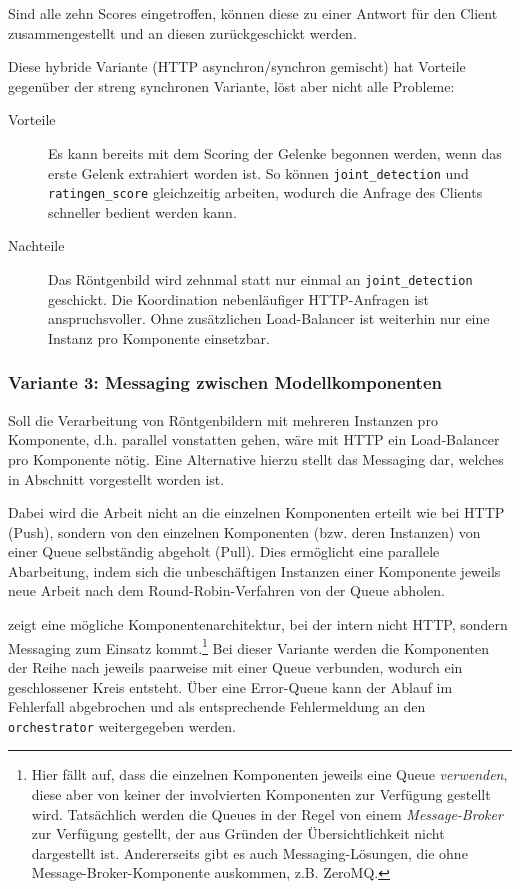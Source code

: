 Sind alle zehn Scores eingetroffen, können diese zu einer Antwort für den Client zusammengestellt und an diesen zurückgeschickt werden.

Diese hybride Variante (HTTP asynchron/synchron gemischt) hat Vorteile gegenüber der streng synchronen Variante, löst aber nicht alle Probleme:

\begin{description}
    \item[Vorteile] Es kann bereits mit dem Scoring der Gelenke begonnen werden, wenn das erste Gelenk extrahiert worden ist. So können \texttt{joint\_detection} und \texttt{ratingen\_score} gleichzeitig arbeiten, wodurch die Anfrage des Clients schneller bedient werden kann.
    \item[Nachteile] Das Röntgenbild wird zehnmal statt nur einmal an \texttt{joint\_detection} geschickt. Die Koordination nebenläufiger HTTP-Anfragen ist anspruchsvoller. Ohne zusätzlichen Load-Balancer ist weiterhin nur eine Instanz pro Komponente einsetzbar.
\end{description}

\subsubsection{Variante 3: Messaging zwischen Modellkomponenten}
\label{sec:variante-3-messaging}

Soll die Verarbeitung von Röntgenbildern mit mehreren Instanzen pro Komponente, d.h. parallel vonstatten gehen, wäre mit HTTP ein Load-Balancer pro Komponente nötig. Eine Alternative hierzu stellt das Messaging dar, welches in Abschnitt  vorgestellt worden ist.

Dabei wird die Arbeit nicht an die einzelnen Komponenten erteilt wie bei HTTP (Push), sondern von den einzelnen Komponenten (bzw. deren Instanzen) von einer Queue selbständig abgeholt (Pull). Dies ermöglicht eine parallele Abarbeitung, indem sich die unbeschäftigen Instanzen einer Komponente jeweils neue Arbeit nach dem Round-Robin-Verfahren von der Queue abholen.

 zeigt eine mögliche Komponentenarchitektur, bei der intern nicht HTTP, sondern Messaging zum Einsatz kommt.\footnote{Hier fällt auf, dass die einzelnen Komponenten jeweils eine Queue \textit{verwenden}, diese aber von keiner der involvierten Komponenten zur Verfügung gestellt wird. Tatsächlich werden die Queues in der Regel von einem \textit{Message-Broker} zur Verfügung gestellt, der aus Gründen der Übersichtlichkeit nicht dargestellt ist. Andererseits gibt es auch Messaging-Lösungen, die ohne Message-Broker-Komponente auskommen, z.B. ZeroMQ.} Bei dieser Variante werden die Komponenten der Reihe nach jeweils paarweise mit einer Queue verbunden, wodurch ein geschlossener Kreis entsteht. Über eine Error-Queue kann der Ablauf im Fehlerfall abgebrochen und als entsprechende Fehlermeldung an den \texttt{orchestrator} weitergegeben werden.


